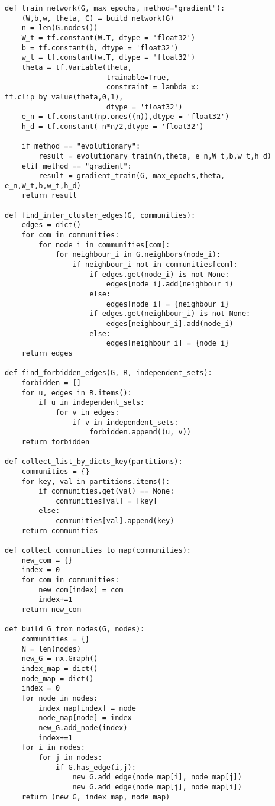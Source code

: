 \begin{lstlisting}
def train_network(G, max_epochs, method="gradient"):
    (W,b,w, theta, C) = build_network(G)
    n = len(G.nodes())
    W_t = tf.constant(W.T, dtype = 'float32')
    b = tf.constant(b, dtype = 'float32')
    w_t = tf.constant(w.T, dtype = 'float32')
    theta = tf.Variable(theta,
                        trainable=True,
                        constraint = lambda x: tf.clip_by_value(theta,0,1),
                        dtype = 'float32')
    e_n = tf.constant(np.ones((n)),dtype = 'float32')
    h_d = tf.constant(-n*n/2,dtype = 'float32') 

    if method == "evolutionary":
        result = evolutionary_train(n,theta, e_n,W_t,b,w_t,h_d)
    elif method == "gradient":
        result = gradient_train(G, max_epochs,theta, e_n,W_t,b,w_t,h_d)
    return result

def find_inter_cluster_edges(G, communities):
    edges = dict()
    for com in communities:
        for node_i in communities[com]:
            for neighbour_i in G.neighbors(node_i):
                if neighbour_i not in communities[com]:
                    if edges.get(node_i) is not None:
                        edges[node_i].add(neighbour_i)
                    else:
                        edges[node_i] = {neighbour_i}
                    if edges.get(neighbour_i) is not None:
                        edges[neighbour_i].add(node_i)
                    else:
                        edges[neighbour_i] = {node_i}
    return edges

def find_forbidden_edges(G, R, independent_sets):
    forbidden = []
    for u, edges in R.items():
        if u in independent_sets:
            for v in edges:
                if v in independent_sets:
                    forbidden.append((u, v))
    return forbidden
    
def collect_list_by_dicts_key(partitions):
    communities = {}
    for key, val in partitions.items():
        if communities.get(val) == None:
            communities[val] = [key]
        else:
            communities[val].append(key)
    return communities

def collect_communities_to_map(communities):
    new_com = {}
    index = 0
    for com in communities:
        new_com[index] = com
        index+=1
    return new_com

def build_G_from_nodes(G, nodes):
    communities = {}
    N = len(nodes)
    new_G = nx.Graph()
    index_map = dict()
    node_map = dict()
    index = 0
    for node in nodes:
        index_map[index] = node
        node_map[node] = index
        new_G.add_node(index)
        index+=1
    for i in nodes:
        for j in nodes:
            if G.has_edge(i,j):
                new_G.add_edge(node_map[i], node_map[j])
                new_G.add_edge(node_map[j], node_map[i])
    return (new_G, index_map, node_map)


\end{lstlisting}
